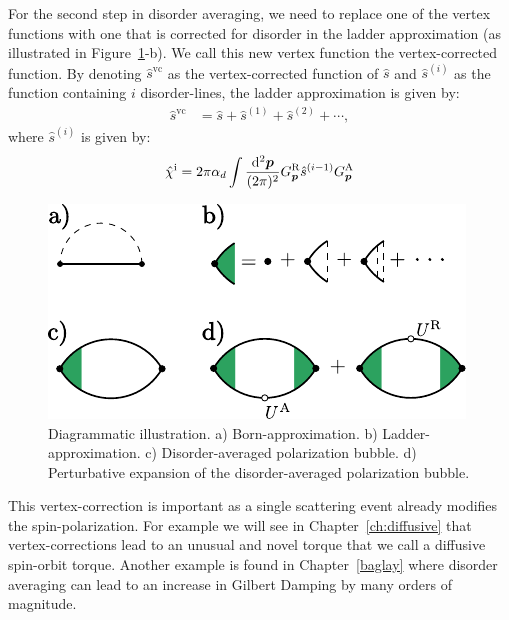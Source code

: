 For the second step in disorder averaging, we need to replace one of the vertex functions with one that is corrected for disorder in the ladder approximation (as illustrated in Figure~\ref{sd:fig:diagrams}-b). We call this new vertex function the vertex-corrected function. 
By denoting $\hat{s}^{\text{vc}}$ as the vertex-corrected function of $\hat{s}$ and $\hat{s}^{(i)}$ as the function containing $i$ disorder-lines, the ladder approximation is given by:
\begin{align}
    \hat{s}^\text{vc}
      &=           
        \hat{s}+\hat{s}^{(1)}+\hat{s}^{(2)}+\cdots,
        \label{sd:eq:ladder}
\end{align}
where $\hat{s}^{(i)}$ is given by:
\begin{align}
    \hat{\chi}^\text{i} = 2\pi\alpha_d\int\frac{\mathrm{d}^2\boldsymbol{p}}{(2\pi)^2} G_{\boldsymbol{p}}^\text{R}\hat{s}^{(i-1)}G_{\boldsymbol{p}}^\text{A}
    \label{eq:onedisorderline}
\end{align}

\begin{figure}
    \centering
    \includegraphics{articles/misha_paper/app5.pdf}
    \caption{Diagrammatic illustration. a) Born-approximation. b) Ladder-approximation. c) Disorder-averaged polarization bubble. d) Perturbative expansion of the disorder-averaged polarization bubble. }
    \label{sd:fig:diagrams}
\end{figure}
This vertex-correction is important as a single scattering event already modifies the spin-polarization. For example we will see in Chapter~\ref{ch:diffusive} that vertex-corrections lead to an unusual and novel torque that we call a diffusive spin-orbit torque. Another example is found in Chapter~\ref{baglay} where disorder averaging can lead to an increase in Gilbert Damping by many orders of magnitude. 

